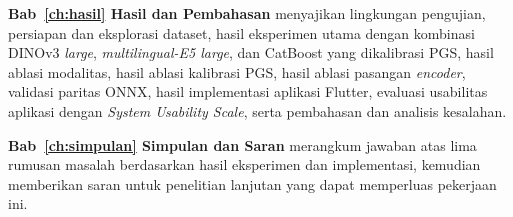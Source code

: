 \textbf{Bab~\ref{ch:hasil} Hasil dan Pembahasan} menyajikan lingkungan pengujian, persiapan dan eksplorasi dataset, hasil eksperimen utama dengan kombinasi DINOv3 \textit{large}, \textit{multilingual-E5 large}, dan CatBoost yang dikalibrasi PGS, hasil ablasi modalitas, hasil ablasi kalibrasi PGS, hasil ablasi pasangan \textit{encoder}, validasi paritas ONNX, hasil implementasi aplikasi Flutter, evaluasi usabilitas aplikasi dengan \textit{System Usability Scale}, serta pembahasan dan analisis kesalahan.

\textbf{Bab~\ref{ch:simpulan} Simpulan dan Saran} merangkum jawaban atas lima rumusan masalah berdasarkan hasil eksperimen dan implementasi, kemudian memberikan saran untuk penelitian lanjutan yang dapat memperluas pekerjaan ini.
